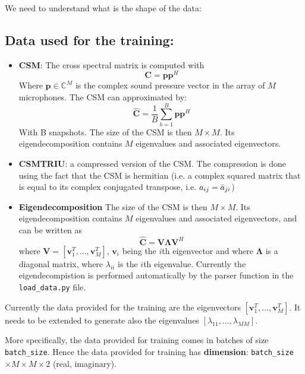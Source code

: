 \documentclass{article}
\begin{document}
We need to understand what is the shape of the data:

\subsection{Data used for the training:}

\begin{itemize}
    \item \textbf{CSM}: The cross spectral matrix is computed with
    \begin{equation}
        \mathbf{C} = \mathbf{p} \mathbf{p}^H
    \end{equation}
    Where $\mathbf{p} \in \mathbb{C}^M$ is the complex sound pressure vector in the array of $M$ microphones. The CSM can approximated by:
    \begin{equation}
        \hat{\mathbf{C}} = \frac{1}{B} \sum_{b=1}^{B} \mathbf{p} \mathbf{p}^H
    \end{equation} 
    With  B snapshots. The size of the CSM is then $M \times M$. Its eigendecomposition contains $M$ eigenvalues and associated eigenvectors.
    \item \textbf{CSMTRIU}: a compressed version of the CSM. The compression is done using the fact that the CSM is hermitian (i.e. a complex squared matrix that is equal to its complex conjugated transpose, i.e. $a_{ij} = \Bar{a}_{ji}$)
    \item \textbf{Eigendecomposition} The size of the CSM is then $M \times M$. Its eigendecomposition contains $M$ eigenvalues and associated eigenvectors, and can be written as 
    \begin{equation}
        \hat{\mathbf{C}} = \mathbf{V} \mathbf{\Lambda} \mathbf{V}^H
    \end{equation}
    where $\mathbf{V} = [\mathbf{v}_1^T, \dots, \mathbf{v}_M^T]$, $\mathbf{v}_i$ being the $i$th eigenvector and where $\mathbf{\Lambda}$ is a diagonal matrix, where $\lambda_{ii}$ is the $i$th eigenvalue. Currently the eigendecompistion is performed automatically by the parser function in the \lstinline{load_data.py} file.
\end{itemize}

Currently the data provided for the training are the eigenvectors $[\mathbf{v}_1^T, \dots, \mathbf{v}_M^T]$. It needs to be extended to generate also the eigenvalues $[\lambda_{11}, \dots, \lambda_{MM}]$. 

More specifically, the data provided for training comes in batches of size \lstinline{batch_size}. Hence the data provided for training has \textbf{dimension}: \lstinline{batch_size} $\times M \times M \times 2$ (real, imaginary).
\end{document}
